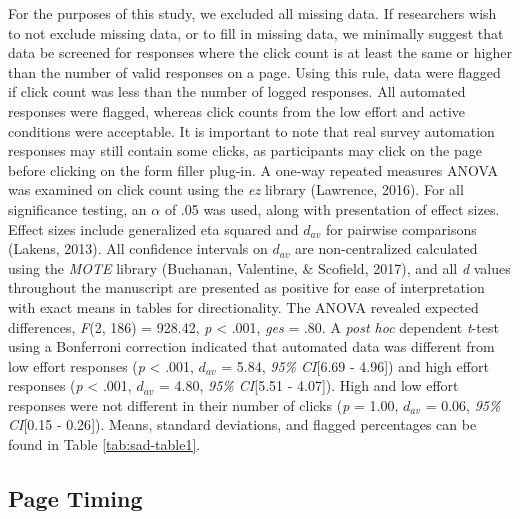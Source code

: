 \documentclass[english,man]{apa6}
\theoremstyle{definition}
\theoremstyle{definition}
\theoremstyle{definition}
\theoremstyle{remark}
\begin{document}
For the purposes of this study, we excluded all missing data. If
researchers wish to not exclude missing data, or to fill in missing
data, we minimally suggest that data be screened for responses where the
click count is at least the same or higher than the number of valid
responses on a page. Using this rule, data were flagged if click count
was less than the number of logged responses. All automated responses
were flagged, whereas click counts from the low effort and active
conditions were acceptable. It is important to note that real survey
automation responses may still contain some clicks, as participants may
click on the page before clicking on the form filler plug-in. A one-way
repeated measures ANOVA was examined on click count using the \emph{ez}
library (Lawrence, 2016). For all significance testing, an \(\alpha\) of
.05 was used, along with presentation of effect sizes. Effect sizes
include generalized eta squared and \(d_{av}\) for pairwise comparisons
(Lakens, 2013). All confidence intervals on \(d_{av}\) are
non-centralized calculated using the \emph{MOTE} library (Buchanan,
Valentine, \& Scofield, 2017), and all \emph{d} values throughout the
manuscript are presented as positive for ease of interpretation with
exact means in tables for directionality. The ANOVA revealed expected
differences, \emph{F}(2, 186) = 928.42, \emph{p} \textless{} .001,
\emph{ges} = .80. A \emph{post hoc} dependent \emph{t}-test using a
Bonferroni correction indicated that automated data was different from
low effort responses (\emph{p} \textless{} .001, \(d_{av}\) = 5.84,
\emph{95\% CI}{[}6.69 - 4.96{]}) and high effort responses (\emph{p}
\textless{} .001, \(d_{av}\) = 4.80, \emph{95\% CI}{[}5.51 - 4.07{]}).
High and low effort responses were not different in their number of
clicks (\emph{p} = 1.00, \(d_{av}\) = 0.06, \emph{95\% CI}{[}0.15 -
0.26{]}). Means, standard deviations, and flagged percentages can be
found in Table \ref{tab:sad-table1}.

\subsection{Page Timing}\label{page-timing-1}
\end{document}
